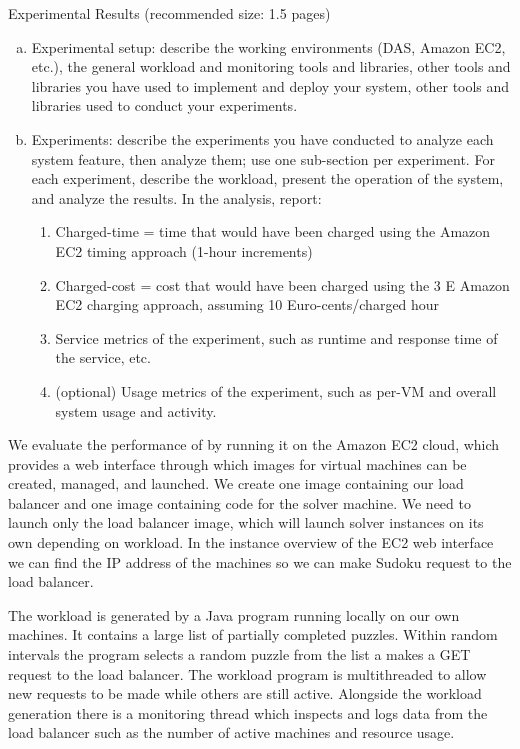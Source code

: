 Experimental Results (recommended size: 1.5 pages)

\begin{enumerate}[(a)]
	\item Experimental setup: describe the working environments (DAS, Amazon EC2,
	etc.), the general workload and monitoring tools and libraries, other tools and libraries you have used to implement and deploy your system, other tools and libraries used to conduct your experiments.
	\item Experiments: describe the experiments you have conducted to analyze each system feature, then analyze them; use one sub-section per experiment. For each experiment, describe the workload, present the operation of the system, and analyze the results. In the analysis, report:
	\begin{enumerate}
		\item Charged-time = time that would have been charged using the Amazon EC2 timing approach (1-hour increments)
		\item Charged-cost = cost that would have been charged using the 3
		E
		Amazon EC2 charging approach, assuming 10 Euro-cents/charged hour
		\item Service metrics of the experiment, such as runtime and response time of
		the service, etc.
		\item (optional) Usage metrics of the experiment, such as per-VM and overall
		system usage and activity.
	\end{enumerate}
\end{enumerate}

We evaluate the performance of \appName by running it on the Amazon EC2 cloud, which provides a web interface through which images for virtual machines can be created, managed, and launched.
We create one image containing our load balancer and one image containing code for the solver machine.
We need to launch only the load balancer image, which will launch solver instances on its own depending on workload.
In the instance overview of the EC2 web interface we can find the IP address of the machines so we can make Sudoku request to the load balancer. 

The workload is generated by a Java program running locally on our own machines.
It contains a large list of partially completed puzzles. Within random intervals the program selects a random puzzle from the list a makes a GET request to the load balancer.   
The workload program is multithreaded to allow new requests to be made while others are still active.
Alongside the workload generation there is a monitoring thread which inspects and logs data from the load balancer such as the number of active machines and resource usage.

